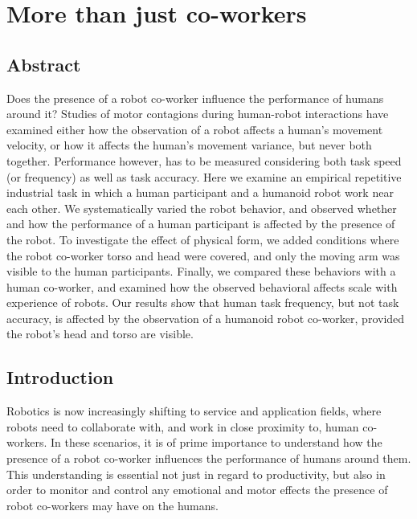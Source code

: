 
{\color{blue}\chapter{More than just co-workers}\label{more than just co-workers}}

\section*{Abstract}
Does the presence of a robot co-worker influence the performance of humans around it? Studies of motor contagions during human-robot interactions have examined either how the observation of a robot affects a human's movement velocity, or how it affects the human's movement variance, but never both together. Performance however, has to be measured considering both task speed (or frequency) as well as task accuracy. Here we examine an empirical repetitive industrial task in which a human participant and a humanoid robot work near each other. We systematically varied the robot behavior, and observed whether and how the performance of a human participant is affected by the presence of the robot. To investigate the effect of physical form, we added conditions where the robot co-worker torso and head were covered, and only the moving arm was visible to the human participants. Finally, we compared these behaviors with a human co-worker, and examined how the observed behavioral affects scale with experience of robots. Our results show that human task frequency, but not task accuracy, is affected by the observation of a humanoid robot co-worker, provided the robot's head and torso are visible.

\clearpage
\section{Introduction}
Robotics is now increasingly shifting to service and application fields, where robots need to collaborate with, and work in close proximity to, human co-workers. In these scenarios, it is of prime importance to understand how the presence of a robot co-worker influences the performance of humans around them. This understanding is essential not just in regard to productivity, but also in order to monitor and control any emotional and motor effects the presence of robot co-workers may have on the humans.

